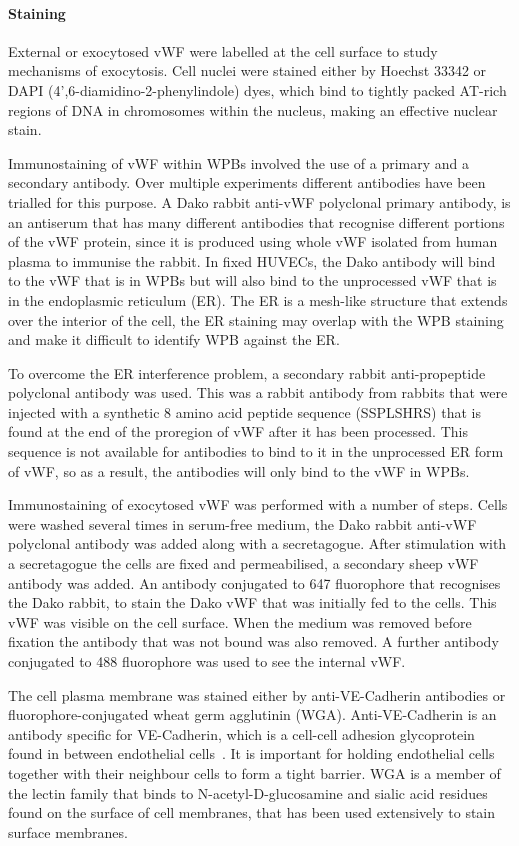 \paragraph{Staining}
External or exocytosed vWF were labelled at the cell surface to study mechanisms of exocytosis. Cell nuclei were stained either by Hoechst 33342 or DAPI (4',6-diamidino-2-phenylindole) dyes, which bind to tightly packed AT-rich regions of DNA in chromosomes within the nucleus, making an effective nuclear stain.

Immunostaining of vWF within WPBs involved the use of a primary and a secondary antibody. Over multiple experiments different antibodies have been trialled for this purpose. A Dako rabbit anti-vWF polyclonal primary antibody, is an antiserum that has many different antibodies that recognise different portions of the vWF protein, since it is produced using whole vWF isolated from human plasma to immunise the rabbit. In fixed HUVECs, the Dako antibody will bind to the vWF that is in WPBs but will also bind to the unprocessed vWF that is in the endoplasmic reticulum (ER). The ER is a mesh-like structure that extends over the interior of the cell, the ER staining may overlap with the WPB staining and make it difficult to identify WPB against the ER.

To overcome the ER interference problem, a secondary rabbit anti-propeptide polyclonal antibody was used. This was a rabbit antibody from rabbits that were injected with a synthetic 8 amino acid peptide sequence (SSPLSHRS) that is found at the end of the proregion of vWF after it has been processed. This sequence is not available for antibodies to bind to it in the unprocessed ER form of vWF, so as a result, the antibodies will only bind to the vWF in WPBs.

Immunostaining of exocytosed vWF was performed with a number of steps. Cells were washed several times in serum-free medium, the Dako rabbit anti-vWF polyclonal antibody was added along with a secretagogue. After stimulation with a secretagogue the cells are fixed and permeabilised, a secondary sheep vWF antibody was added. An antibody conjugated to 647 fluorophore that recognises the Dako rabbit, to stain the Dako vWF that was initially fed to the cells. This vWF was visible on the cell surface. When the medium was removed before fixation the antibody that was not bound was also removed. A further antibody conjugated to 488 fluorophore was used to see the internal vWF.

The cell plasma membrane was stained either by anti-VE-Cadherin antibodies or fluorophore-conjugated wheat germ agglutinin (WGA). Anti-VE-Cadherin is an antibody specific for VE-Cadherin, which is a cell-cell adhesion glycoprotein found in between endothelial cells~\cite{Vestweber2008}. It is important for holding endothelial cells together with their neighbour cells to form a tight barrier. WGA is a member of the lectin family that binds to N-acetyl-D-glucosamine and sialic acid residues found on the surface of cell membranes, that has been used extensively to stain surface membranes.

